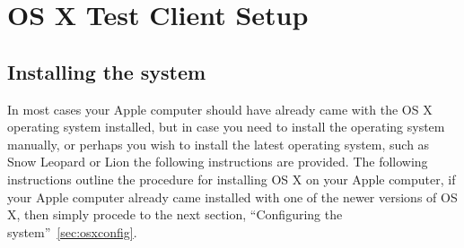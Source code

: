 \section{OS X Test Client Setup}
\subsection{Installing the system}
\label{sec:osxinstall}

In most cases your Apple computer should have already came with the OS X operating system installed, but in case you need to
install the operating system manually, or perhaps you wish to install the latest operating system, such as Snow Leopard or Lion
the following instructions are provided. The following instructions outline the procedure for installing OS X on your Apple computer, 
if your Apple computer already came installed with one of the newer versions of OS X, then simply procede to the next section,
``Configuring the system''~\ref{sec:osxconfig}.


